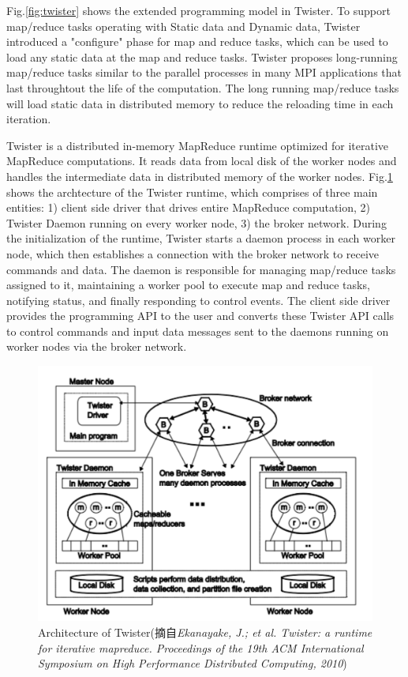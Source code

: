 Fig.\ref{fig:twister} shows the extended programming model in Twister. To support map/reduce tasks operating with Static data and Dynamic data, Twister introduced a "configure" phase for map and reduce tasks, which can be used to load any static data at the map and reduce tasks. Twister proposes long-running map/reduce tasks similar to the parallel processes in many MPI applications that last throughtout the life of the computation. The long running map/reduce tasks will load static data in distributed memory to reduce the reloading time in each iteration.

Twister is a distributed in-memory MapReduce runtime optimized for iterative MapReduce computations. It reads data from local disk of the worker nodes and handles the intermediate data in distributed memory of the worker nodes. Fig.\ref{fig:twisterarch} shows the archtecture of the Twister runtime, which comprises of three main entities: 1) client side driver that drives entire MapReduce computation, 2) Twister Daemon running on every worker node, 3) the broker network. During the initialization of the runtime, Twister starts a daemon process in each  worker node, which then establishes a connection with the broker network to receive commands and data. The daemon is  responsible for managing map/reduce tasks assigned to it, maintaining a worker pool to execute map and reduce tasks, notifying status, and finally responding to control  events. The client side driver provides the programming API to the user and converts these Twister API calls to control commands and input data messages sent to the daemons running on worker nodes via the broker network.

\begin{figure}[]
\centering
\includegraphics[width=5in]{../figures/twisterarch.pdf}
\caption{Architecture of Twister(摘自\textit{Ekanayake, J.; et al. Twister: a runtime for iterative mapreduce. Proceedings of the 19th ACM International Symposium on High Performance Distributed Computing, 2010})}
\label{fig:twisterarch}
\end{figure}

